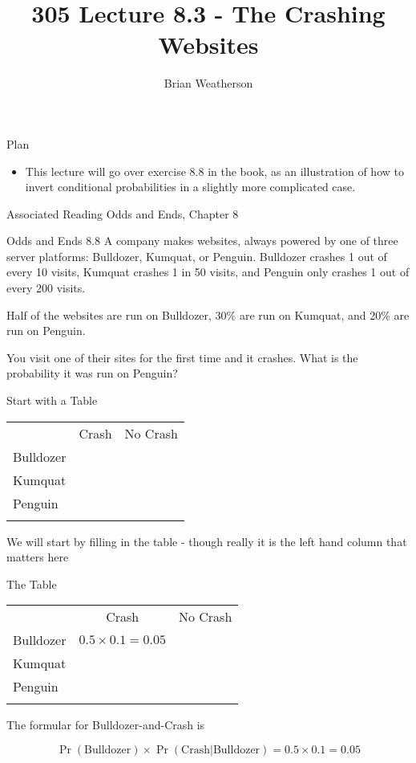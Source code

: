 \documentclass[
  ignorenonframetext,
]{beamer}
\title{305 Lecture 8.3 - The Crashing Websites}
\author{Brian Weatherson}
\date{}
\providecommand{\tightlist}{%
  \setlength{\itemsep}{0pt}\setlength{\parskip}{0pt}}
\renewcommand{\,}{\text{, }}
\begin{document}
\frame{\titlepage}

\begin{frame}{Plan}
\protect\hypertarget{plan}{}
\begin{itemize}
\tightlist
\item
  This lecture will go over exercise 8.8 in the book, as an illustration
  of how to invert conditional probabilities in a slightly more
  complicated case.
\end{itemize}
\end{frame}

\begin{frame}{Associated Reading}
\protect\hypertarget{associated-reading}{}
Odds and Ends, Chapter 8
\end{frame}

\begin{frame}{Odds and Ends 8.8}
\protect\hypertarget{odds-and-ends-8.8}{}
A company makes websites, always powered by one of three server
platforms: Bulldozer, Kumquat, or Penguin. Bulldozer crashes 1 out of
every 10 visits, Kumquat crashes 1 in 50 visits, and Penguin only
crashes 1 out of every 200 visits.

Half of the websites are run on Bulldozer, 30\% are run on Kumquat, and
20\% are run on Penguin.

You visit one of their sites for the first time and it crashes. What is
the probability it was run on Penguin?
\end{frame}

\begin{frame}{Start with a Table}
\protect\hypertarget{start-with-a-table}{}
\begin{longtable}[]{@{}lcc@{}}
\toprule
& Crash & No Crash \\ \addlinespace
\midrule
\endhead
Bulldozer & & \\ \addlinespace
Kumquat & & \\ \addlinespace
Penguin & & \\ \addlinespace
\bottomrule
\end{longtable}

We will start by filling in the table - though really it is the left
hand column that matters here
\end{frame}

\begin{frame}{The Table}
\protect\hypertarget{the-table}{}
\begin{longtable}[]{@{}lcc@{}}
\toprule
& Crash & No Crash \\ \addlinespace
\midrule
\endhead
Bulldozer & \(0.5 \times 0.1 = 0.05\) & \\ \addlinespace
Kumquat & & \\ \addlinespace
Penguin & & \\ \addlinespace
\bottomrule
\end{longtable}

The formular for Bulldozer-and-Crash is

\[
\Pr(\text{Bulldozer}) \times \Pr(\text{Crash}|\text{Bulldozer}) = 0.5 \times 0.1 = 0.05
\]
\end{frame}
\end{document}
